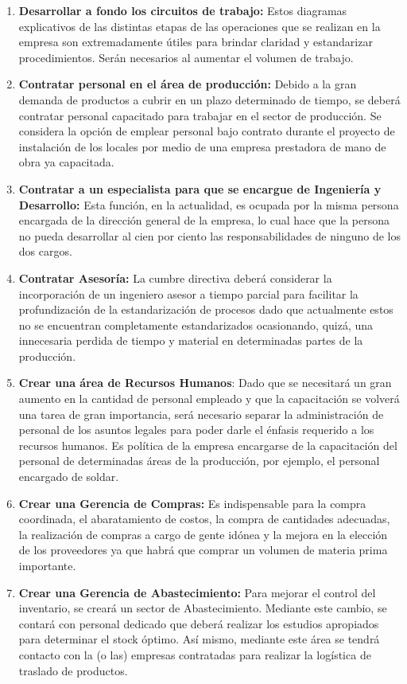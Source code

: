 \documentclass[a4paper,10pt,titlepage]{article}
\begin{document}
\begin{enumerate}
\item \textbf{Desarrollar a fondo los circuitos de trabajo:} Estos diagramas explicativos de las distintas etapas de las operaciones que se realizan en la empresa son extremadamente \'utiles para brindar claridad y estandarizar procedimientos. Ser\'an necesarios al aumentar el volumen de trabajo.

\item \textbf{Contratar personal en el \'area de producci\'on:} Debido a la gran demanda de productos a cubrir en un plazo determinado de tiempo, se deber\'a contratar personal capacitado para trabajar en el sector de producci\'on. Se considera la opci\'on de emplear personal bajo contrato durante el proyecto de instalaci\'on de los locales por medio de una empresa prestadora de mano de obra ya capacitada.

\item \textbf{Contratar a un especialista para que se encargue de Ingenier\'ia y Desarrollo:} Esta funci\'on, en la actualidad, es ocupada por la misma persona encargada de la direcci\'on general de la empresa, lo cual hace que la persona no pueda desarrollar al cien por ciento las responsabilidades de ninguno de los dos cargos.

\item \textbf{Contratar Asesor\'ia:} La cumbre directiva deber\'a considerar la incorporaci\'on de un ingeniero asesor a tiempo parcial para facilitar la profundizaci\'on de la estandarizaci\'on de procesos dado que actualmente estos no se encuentran completamente estandarizados ocasionando, quizá, una innecesaria perdida de tiempo y material en determinadas partes de la producción.

\item \textbf{Crear una \'area de Recursos Humanos}: Dado que se necesitar\'a un gran aumento en la cantidad de personal empleado y que la capacitaci\'on se volver\'a una tarea de gran importancia, ser\'a necesario separar la administraci\'on de personal de los asuntos legales para poder darle el \'enfasis requerido a los recursos humanos. Es política de la empresa encargarse de la capacitación del personal de determinadas áreas de la producción, por ejemplo, el personal encargado de soldar. 

\item \textbf{Crear una Gerencia de Compras:} Es indispensable para la compra coordinada, el abaratamiento de costos, la compra de cantidades adecuadas, la realizaci\'on de compras a cargo de gente id\'onea y la mejora en la elecci\'on de los proveedores ya que habrá que comprar un volumen de materia prima importante.

\item \textbf{Crear una Gerencia de Abastecimiento:} Para mejorar el control del inventario, se crear\'a un sector de Abastecimiento. Mediante este cambio, se contar\'a con personal dedicado que deber\'a realizar los estudios apropiados para determinar el stock \'optimo. As\'i mismo, mediante este \'area se tendr\'a contacto con la (o las) empresas contratadas para realizar la log\'istica de traslado de productos.

\end{enumerate}
\end{document}
